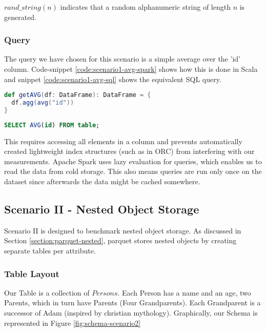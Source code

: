 $rand\_string(n)$ indicates that a random alphanumeric string of length $n$ is generated.

\subsubsection{Query}
\label{sec:query-one}
The query we have chosen for this scenario is a simple average over the 'id' column.
Code-snippet \ref{code:scenario1-avg-spark} shows how this is done in Scala and snippet \ref{code:scenario1-avg-sql} shows the equivalent SQL query.

\begin{minipage}{\linewidth}
\begin{lstlisting}[language=Scala,caption=Average over the ID Column in Spark, label=code:scenario1-avg-spark]
def getAVG(df: DataFrame): DataFrame = {
  df.agg(avg("id"))
}
\end{lstlisting}
\end{minipage}

\begin{minipage}{\linewidth}
\begin{lstlisting}[language=SQL,caption=Equivalent SQL Query, label=code:scenario1-avg-sql]
  SELECT AVG(id) FROM table;
\end{lstlisting}
\end{minipage}

This requires accessing all elements in a column and prevents automatically created lightweight index structures (such as in ORC) from interfering with our measurements.
Apache Spark uses lazy evaluation for queries, which enables us to read the data from cold storage.
This also means queries are run only once on the dataset since afterwards the data might be cached somewhere.

\subsection{Scenario II - Nested Object Storage}
Scenario II is designed to benchmark nested object storage.
As discussed in Section \ref{section:parquet-nested}, parquet stores nested objects by creating separate tables per attribute.

\subsubsection{Table Layout}

Our Table is a collection of $Persons$. Each Person has a name and an age, two Parents, which in turn have Parents (Four Grandparents).
Each Grandparent is a successor of Adam (inspired by christian mythology). Graphically, our Schema is represented in Figure \ref{fig:schema-scenario2}

